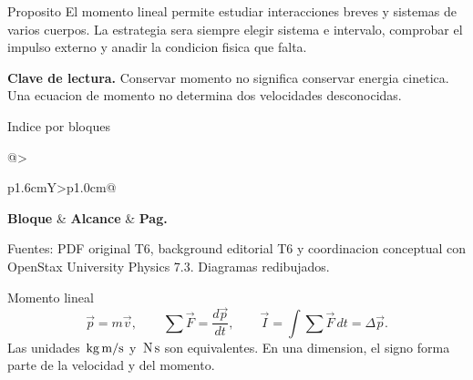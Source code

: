 \documentclass[10pt,a4paper]{article}
\begin{document}
\shorthandoff{<>}
\color{Ink}


\begin{lessoncard}{Proposito}
El momento lineal permite estudiar interacciones breves y sistemas de varios cuerpos. La estrategia sera siempre elegir sistema e intervalo, comprobar el impulso externo y anadir la condicion fisica que falta.
\begin{keybox}
\textbf{Clave de lectura.} Conservar momento no significa conservar energia cinetica. Una ecuacion de momento no determina dos velocidades desconocidas.
\end{keybox}
\end{lessoncard}

\begin{lessoncard}{Indice por bloques}
\footnotesize
\begin{tabularx}{\linewidth}{@{}>{\raggedright\arraybackslash}p{1.6cm}Y>{\raggedleft\arraybackslash\bfseries}p{1.0cm}@{}}
\textbf{Bloque} & \textbf{Alcance} & \textbf{Pag.}\\
\midrule
{}
\end{tabularx}
\end{lessoncard}

{\scriptsize\textcolor{Muted}{Fuentes: PDF original T6, background editorial T6 y coordinacion conceptual con OpenStax University Physics 7.3. Diagramas redibujados.}}

\clearpage

\begin{lessoncard}{Momento lineal}
\[
\vec p=m\vec v,\qquad \sum\vec F=\frac{d\vec p}{dt},\qquad
\vec I=\int\sum\vec F\,dt=\Delta\vec p.
\]
Las unidades $\,\mathrm{kg}\,\mathrm{m/s}$ y $\,\mathrm{N}\,\mathrm{s}$ son equivalentes. En una dimension, el signo forma parte de la velocidad y del momento.
\end{lessoncard}
\end{document}
